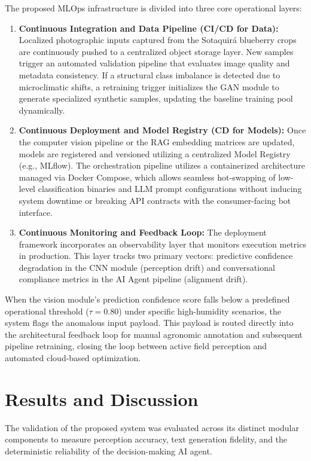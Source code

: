 \documentclass[11pt]{article}
\begin{document}
The proposed MLOps infrastructure is divided into three core operational layers:
\begin{enumerate}
    \item \textbf{Continuous Integration and Data Pipeline (CI/CD for Data):} Localized photographic inputs captured from the Sotaquirá blueberry crops are continuously pushed to a centralized object storage layer. New samples trigger an automated validation pipeline that evaluates image quality and metadata consistency. If a structural class imbalance is detected due to microclimatic shifts, a retraining trigger initializes the GAN module to generate specialized synthetic samples, updating the baseline training pool dynamically.
    \item \textbf{Continuous Deployment and Model Registry (CD for Models):} Once the computer vision pipeline or the RAG embedding matrices are updated, models are registered and versioned utilizing a centralized Model Registry (e.g., MLflow). The orchestration pipeline utilizes a containerized architecture managed via Docker Compose, which allows seamless hot-swapping of low-level classification binaries and LLM prompt configurations without inducing system downtime or breaking API contracts with the consumer-facing bot interface.
    \item \textbf{Continuous Monitoring and Feedback Loop:} The deployment framework incorporates an observability layer that monitors execution metrics in production. This layer tracks two primary vectors: predictive confidence degradation in the CNN module (perception drift) and conversational compliance metrics in the AI Agent pipeline (alignment drift). 
\end{enumerate}

When the vision module's prediction confidence score falls below a predefined operational threshold ($\tau = 0.80$) under specific high-humidity scenarios, the system flags the anomalous input payload. This payload is routed directly into the architectural feedback loop for manual agronomic annotation and subsequent pipeline retraining, closing the loop between active field perception and automated cloud-based optimization.

\section{Results and Discussion}
The validation of the proposed system was evaluated across its distinct modular components to measure perception accuracy, text generation fidelity, and the deterministic reliability of the decision-making AI agent.
\end{document}
